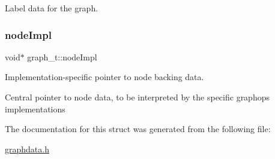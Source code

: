 Label data for the graph. \mbox{\label{structgraph__t_a3bf6344f03f4cbc69345d026da2e3368}} 
\subsubsection{\texorpdfstring{node\+Impl}{nodeImpl}}
{\footnotesize\ttfamily void$\ast$ graph\+\_\+t\+::node\+Impl}



Implementation-\/specific pointer to node backing data. 

Central pointer to node data, to be interpreted by the specific graphops implementations 

The documentation for this struct was generated from the following file\+:\begin{DoxyCompactItemize}
\item 
\hyperlink{graphdata_8h}{graphdata.\+h}\end{DoxyCompactItemize}
